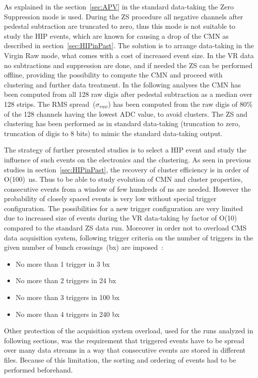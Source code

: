 As explained in the section~\ref{sec:APV} in the standard data-taking the Zero Suppression mode is used. During the ZS procedure all negative channels after pedestal subtraction are truncated to zero, thus this mode is not suitable to study the HIP events, which are known for causing a drop of the CMN as described in section~\ref{sec:HIPinPast}. The solution is to arrange data-taking in the Virgin Raw mode, what comes with a cost of increased event size. In the VR data no subtractions and suppression are done, and if needed the ZS can be performed offline, providing the possibility to compute the CMN and proceed with clustering and further data treatment. In the following analyses the CMN has been computed from all 128 raw digis after pedestal subtraction as a median over 128 strips. The RMS spread~($\sigma_{raw}$) has been computed from the raw digis of 80\% of the 128 channels having the lowest ADC value, to avoid clusters. The ZS and clustering has been performed as in standard data-taking (truncation to zero, truncation of digis to 8 bits) to mimic the standard data-taking output.

The strategy of further presented studies is to select a HIP event and study the influence of such events on the electronics and the clustering. As seen in previous studies in section~\ref{sec:HIPinPast}, the recovery of cluster efficiency is in order of O(100)~ns. Thus to be able to study evolution of CMN and cluster properties, consecutive events from a window of few hundreds of ns are needed. However the probability of closely spaced events is very low without special trigger configuration. The possibilities for a new trigger configuration are very limited due to increased size of events during the VR data-taking by factor of O(10) compared to the standard ZS data run. Moreover in order not to overload CMS data acquisition system, following trigger criteria on the number of triggers in the given number of bunch crossings~(bx) are imposed~\cite{website:VRtrigger}:

\begin{itemize}
\item{No more than 1 trigger in 3 bx}
\item{No more than 2 triggers in 24 bx}
\item{No more than 3 triggers in 100 bx}
\item{No more than 4 triggers in 240 bx}
\end{itemize}

Other protection of the acquisition system overload, used for the runs analyzed in following sections, was the requirement that triggered events have to be spread over many data streams in a way that consecutive events are stored in different files. Because of this limitation, the sorting and ordering of events had to be performed beforehand.

